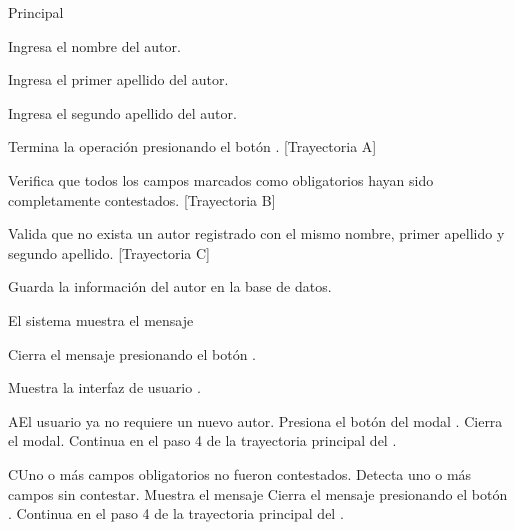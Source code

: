 \begin{UCtrayectoria}{Principal}
    
    \UCpaso[\UCactor] Ingresa el nombre del autor.
    
    \UCpaso[\UCactor] Ingresa el primer apellido del autor.
    
    \UCpaso[\UCactor] Ingresa el segundo apellido del autor.
    
    \UCpaso[\UCactor] Termina la operación presionando el botón . [Trayectoria A]
    
    \UCpaso Verifica que todos los campos marcados como obligatorios hayan sido completamente contestados. [Trayectoria B]
    
    \UCpaso Valida que no exista un autor registrado con el mismo nombre, primer apellido y segundo apellido. [Trayectoria C]
        
    \UCpaso Guarda la información del autor en la base de datos.
    
    \UCpaso El sistema muestra el mensaje 
    
    \UCpaso[\UCactor] Cierra el mensaje presionando el botón .
    
    \UCpaso Muestra la interfaz de usuario .
\end{UCtrayectoria}


\begin{UCtrayectoriaA}{A}{El usuario ya no requiere un nuevo autor.}
	\UCpaso[\UCactor] Presiona el botón \IUbutton{\bigotimes} del modal .
	\UCpaso Cierra el modal.
	\UCpaso Continua en el paso 4 de la trayectoria principal del .
\end{UCtrayectoriaA}



\begin{UCtrayectoriaA}{C}{Uno o más campos obligatorios no fueron contestados.}
	\UCpaso Detecta uno o más campos sin contestar.
    \UCpaso Muestra el mensaje 
    \UCpaso[\UCactor] Cierra el mensaje presionando el botón .
    \UCpaso Continua en el paso 4 de la trayectoria principal del .
\end{UCtrayectoriaA}

